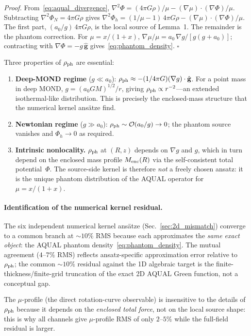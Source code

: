 \documentclass[11pt]{article}
\begin{document}
\textit{Proof.}
From~\eqref{eq:aqual_divergence},
$\nabla^2\Phi=(4\pi G\rho)/\mu-(\nabla\mu)\cdot(\nabla\Phi)/\mu$.
Subtracting $\nabla^2\Phi_N=4\pi G\rho$ gives
$\nabla^2\Phi_h=(1/\mu-1)\,4\pi G\rho-(\nabla\mu)\cdot(\nabla\Phi)/\mu$.
The first part, $(a_0/g)\,4\pi G\rho$, is the local source of Lemma~1.
The remainder is the phantom correction.  For $\mu=x/(1+x)$,
$\nabla\mu/\mu=a_0\,\nabla g/[g(g+a_0)]$; contracting with
$\nabla\Phi=-g\,\hat{\mathbf{g}}$ gives~\eqref{eq:phantom_density}.
\hfill$\square$

Three properties of $\rho_{\rm ph}$ are essential:
\begin{enumerate}
\item \textbf{Deep-MOND regime} ($g\ll a_0$):
  $\rho_{\rm ph}\approx-(1/4\pi G)(\nabla g)\cdot\hat{\mathbf{g}}$.
  For a point mass in deep MOND, $g=(a_0 GM)^{1/2}/r$, giving
  $\rho_{\rm ph}\propto r^{-2}$---an extended isothermal-like
  distribution.  This is precisely the enclosed-mass structure
  that the numerical kernel ans\"atze find.
\item \textbf{Newtonian regime} ($g\gg a_0$):
  $\rho_{\rm ph}\sim\mathcal{O}(a_0/g)\to0$; the phantom source
  vanishes and $\Phi_h\to0$ as required.
\item \textbf{Intrinsic nonlocality.}
  $\rho_{\rm ph}$ at $(R,z)$ depends on $\nabla g$ and $g$, which
  in turn depend on the enclosed mass profile $M_{\rm enc}(R)$ via
  the self-consistent total potential~$\Phi$.  The source-side
  kernel is therefore \emph{not} a freely chosen ansatz: it is the
  unique phantom distribution of the AQUAL operator for
  $\mu=x/(1+x)$.
\end{enumerate}

\paragraph{Identification of the numerical kernel residual.}
The six independent numerical kernel ans\"atze
(Sec.~\ref{sec:2d_mismatch}) converge to a common branch at
$\sim\!10\%$ RMS because each approximates the \emph{same exact
object}: the AQUAL phantom density~\eqref{eq:phantom_density}.
The mutual agreement ($4$--$7\%$ RMS) reflects ansatz-specific
approximation error relative to $\rho_{\rm ph}$; the common
$\sim\!10\%$ residual against the 1D algebraic target is the
finite-thickness/finite-grid truncation of the exact 2D AQUAL Green
function, not a conceptual gap.

The $\mu$-profile (the direct rotation-curve observable) is
insensitive to the details of $\rho_{\rm ph}$ because it depends on
the \emph{enclosed total force}, not on the local source shape: this
is why all channels give $\mu$-profile RMS of only $2$--$5\%$ while
the full-field residual is larger.
\end{document}
